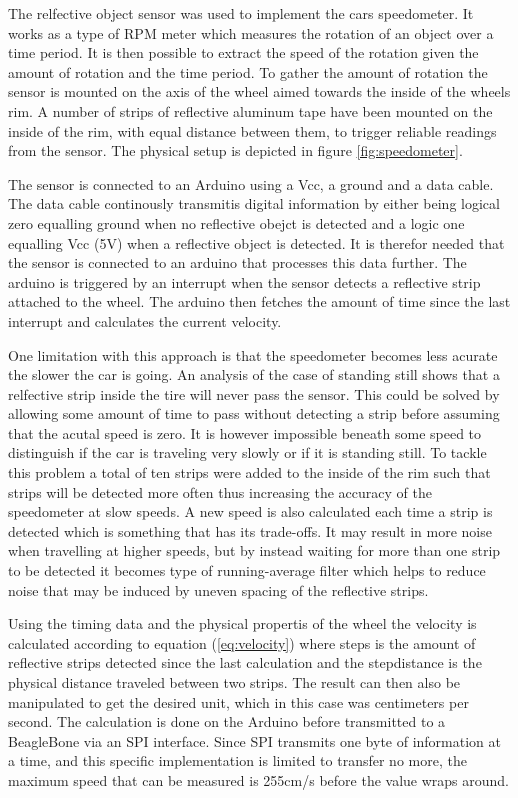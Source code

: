 \documentclass[11pt, titlepage]{article} %
\begin{document}
The relfective object sensor was used to implement the cars speedometer. It works as a type of RPM meter which measures the rotation of an object over a time period. It is then possible to extract the speed of the rotation given the amount of rotation and the time period. To gather the amount of rotation the sensor is mounted on the axis of the wheel aimed towards the inside of the wheels rim. A number of strips of reflective aluminum tape have been mounted on the inside of the rim, with equal distance between them, to trigger reliable readings from the sensor. The physical setup is depicted in figure \ref{fig:speedometer}.

The sensor is connected to an Arduino using a Vcc, a ground and a data cable. The data cable continously transmitis digital information by either being logical zero equalling ground when no reflective obejct is detected and a logic one equalling Vcc (5V) when a reflective object is detected. It is therefor needed that the sensor is connected to an arduino that processes this data further. The arduino is triggered by an interrupt when the sensor detects a reflective strip attached to the wheel. The arduino then fetches the amount of time since the last interrupt and calculates the current velocity.

One limitation with this approach is that the speedometer becomes less acurate the slower the car is going. An analysis of the case of standing still shows that a relfective strip inside the tire will never pass the sensor. This could be solved by allowing some amount of time to pass without detecting a strip before assuming that the acutal speed is zero. It is however impossible beneath some speed to distinguish if the car is traveling very slowly or if it is standing still. To tackle this problem a total of ten strips were added to the inside of the rim such that strips will be detected more often thus increasing the accuracy of the speedometer at slow speeds. A new speed is also calculated each time a strip is detected which is something that has its trade-offs. It may result in more noise when travelling at higher speeds, but by instead waiting for more than one strip to be detected it becomes type of running-average filter which helps to reduce noise that may be induced by uneven spacing of the reflective strips.

    Using the timing data and the physical propertis of the wheel the velocity is calculated according to equation (\ref{eq:velocity}) where steps is the amount of reflective strips detected since the last calculation and the stepdistance is the physical distance traveled between two strips. The result can then also be manipulated to get the desired unit, which in this case was centimeters per second. The calculation is done on the Arduino before transmitted to a BeagleBone via an SPI interface. Since SPI transmits one byte of information at a time, and this specific implementation is limited to transfer no more, the maximum speed that can be measured is 255cm/s before the value wraps around.
\end{document}
